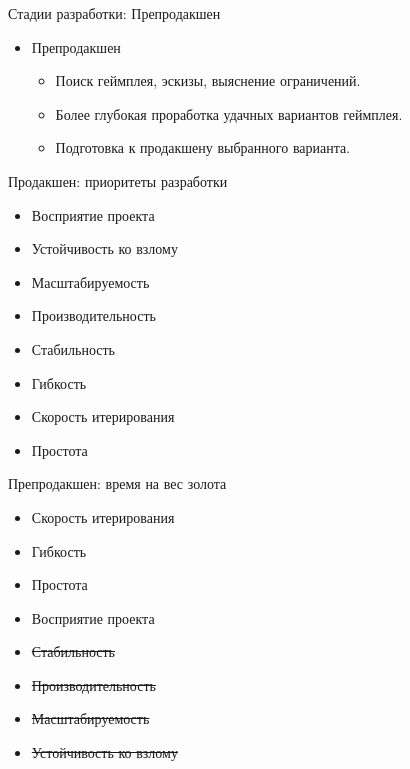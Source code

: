 \documentclass[aspectratio=169,handout,bigger]{beamer}
\newcommand{\soutt}[1]{%
    \renewcommand{\ULthickness}{1pt}%
       \sout{#1}%
    \renewcommand{\ULthickness}{.4pt}%
}
\begin{document}
\begin{frame}{Стадии разработки: Препродакшен}
  \begin{itemize}
    \item Препродакшен
    \begin{itemize}
      \item Поиск геймплея, эскизы, выяснение ограничений.
      \item Более глубокая проработка удачных вариантов геймплея.
      \item Подготовка к продакшену выбранного варианта.
    \end{itemize}
  \end{itemize}
\end{frame}


\begin{frame}{Продакшен: приоритеты разработки}
  \begin{itemize}
    \item\huge{Восприятие проекта}
    \item\LARGE{Устойчивость ко взлому}
    \item\Large{Масштабируемость}
    \item\Large{Производительность}
    \item\large{Стабильность}
    \item\normalsize{Гибкость}
    \item\normalsize{Скорость итерирования}
    \item\normalsize{Простота}
  \end{itemize}
\end{frame}


\begin{frame}{Препродакшен: время на вес золота}
  \begin{itemize}
    \item\huge{Скорость итерирования}
    \item\large{Гибкость}
    \item\large{Простота}
    \item\normalsize{Восприятие проекта}
    \item\soutt{\small{Стабильность}}
    \item\soutt{\small{Производительность}}
    \item\soutt{\small{Масштабируемость}}
    \item\soutt{\small{Устойчивость ко взлому}}
  \end{itemize}
\end{frame}
\end{document}

